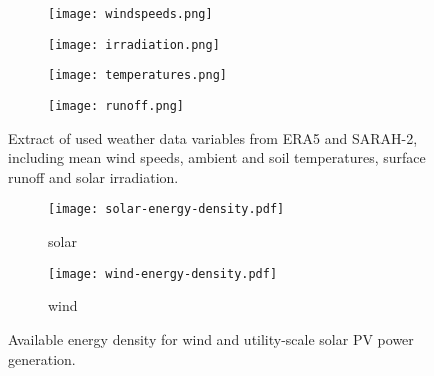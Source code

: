 \begin{figure}
    \centering
        \begin{subfigure}[t]{0.49\textwidth}
            \centering
        \texttt{[image: windspeeds.png]}
    \end{subfigure}
    \begin{subfigure}[t]{0.49\textwidth}
        \centering
        \texttt{[image: irradiation.png]}
    \end{subfigure}
    \begin{subfigure}[t]{0.49\textwidth}
        \centering
        \texttt{[image: temperatures.png]}
    \end{subfigure}
    \begin{subfigure}[t]{0.49\textwidth}
        \centering
        \texttt{[image: runoff.png]}
    \end{subfigure}
    \caption{Extract of used weather data variables from ERA5 and SARAH-2, including mean wind speeds, ambient and soil temperatures, surface runoff and solar irradiation.}
    \label{fig:weather-data}
\end{figure}

\begin{figure}
    \centering
    \begin{subfigure}[t]{0.49\textwidth}
        \centering
        \caption{solar}
        \texttt{[image: solar-energy-density.pdf]}
    \end{subfigure}
    \begin{subfigure}[t]{0.49\textwidth}
        \centering
        \caption{wind}
        \texttt{[image: wind-energy-density.pdf]}
    \end{subfigure}
    \caption{Available energy density for wind and utility-scale solar PV power generation.}
    \label{fig:energy-density}
\end{figure}

